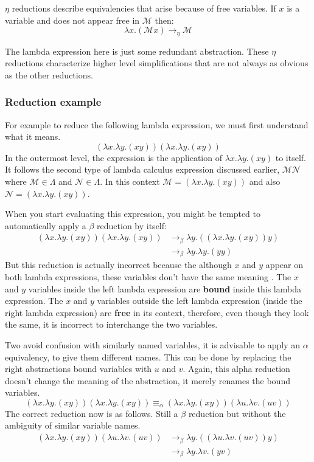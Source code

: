 \(\eta\) reductions describe equivalencies that arise because of free
variables. If \(x\) is a variable and does not appear free in
\(\mathscr{M}\) then: \[
\lambda x.(\mathscr{M}x) \to_\eta \mathscr{M}
\]

The lambda expression here is just some redundant abstraction. These
\(\eta\) reductions characterize higher level simplifications that are
not always as obvious as the other reductions.

\subsubsection{Reduction
example}\label{functional-programming-paradigm.md__reduction-example}

For example to reduce the following lambda expression, we must first
understand what it means. \[
(\lambda x.\lambda y.(xy))(\lambda x.\lambda y.(xy))
\] In the outermost level, the expression is the application of
\(\lambda x.\lambda y.(xy)\) to itself. It follows the second type of
lambda calculus expression discussed earlier, \(\mathscr{M}\mathscr{N}\)
where \(\mathscr{M}\in \Lambda\) and \(\mathscr{N}\in \Lambda\). In this
context \(\mathscr{M} = (\lambda x.\lambda y.(xy))\) and also
\(\mathscr{N} = (\lambda x.\lambda y.(xy))\).

When you start evaluating this expression, you might be tempted to
automatically apply a \(\beta\) reduction by itself: \[
\begin{aligned}
(\lambda x.\lambda y.(xy))(\lambda x.\lambda y.(xy))&\to_{\beta}\lambda y.((\lambda x.\lambda y.(xy))y)\\
&\to_{\beta}\lambda y.\lambda y.(yy)
\end{aligned}
\] But this reduction is actually incorrect because the although \(x\)
and \(y\) appear on both lambda expressions, these variables don't have
the same meaning . The \(x\) and \(y\) variables inside the left lambda
expression are \textbf{bound} inside this lambda expression. The \(x\)
and \(y\) variables outside the left lambda expression (inside the right
lambda expression) are \textbf{free} in its context, therefore, even
though they look the same, it is incorrect to interchange the two
variables.

Two avoid confusion with similarly named variables, it is advisable to
apply an \(\alpha\) equivalency, to give them different names. This can
be done by replacing the right abstractions bound variables with \(u\)
and \(v\). Again, this alpha reduction doesn't change the meaning of the
abstraction, it merely renames the bound variables. \[
(\lambda x.\lambda y.(xy))(\lambda x.\lambda y.(xy))\equiv_\alpha(\lambda x.\lambda y.(xy))(\lambda u.\lambda v.(uv))
\] The correct reduction now is as follows. Still a \(\beta\) reduction
but without the ambiguity of similar variable names. \[
\begin{aligned}
(\lambda x.\lambda y.(xy))(\lambda u.\lambda v.(uv))&\to_\beta \lambda y.((\lambda u.\lambda v.(uv))y)\\
&\to_\beta \lambda y.\lambda v.(yv)
\end{aligned}
\]

